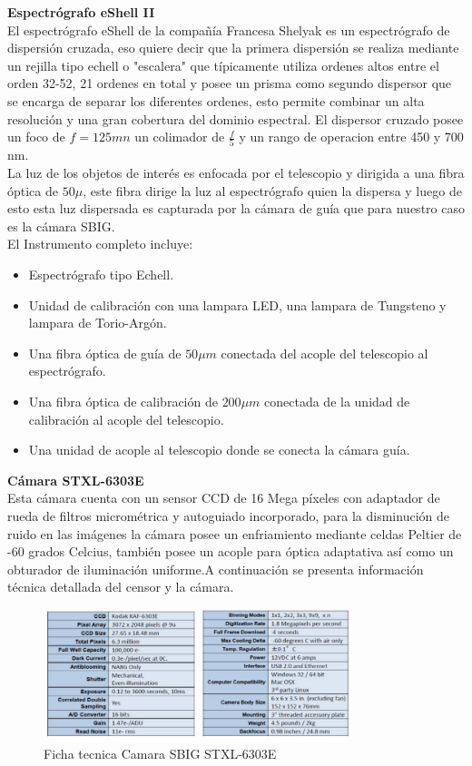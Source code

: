 \noindent \textbf{Espectrógrafo  eShell II }\\

\noindent El espectrógrafo eShell de la compañía Francesa Shelyak es un espectrógrafo de dispersión cruzada, eso quiere decir que la primera dispersión se realiza mediante un rejilla tipo echell  o "escalera" que típicamente utiliza ordenes altos entre el orden 32-52, 21 ordenes en total y posee un prisma como segundo dispersor que se encarga de separar los diferentes ordenes, esto permite combinar un alta resolución y una gran cobertura del dominio espectral.
El dispersor cruzado posee un foco de $f=125 mn$ un colimador de $\frac{f}{5}$ y un rango de operacion entre 450 y 700 nm.\\
La luz de los objetos de interés es enfocada por el telescopio y dirigida a una fibra óptica de $50\mu$, este fibra dirige la luz al espectrógrafo quien la dispersa y luego de esto esta luz dispersada es capturada por la cámara de guía que para nuestro caso es la cámara SBIG.\cite{echell}\\

\noindent El Instrumento completo incluye:

\begin{itemize}
    \item Espectrógrafo tipo Echell.
    \item Unidad de calibración con una lampara LED, una lampara de  Tungsteno y lampara de Torio-Argón.
    \item Una fibra óptica de guía de $50 \mu m$ conectada del acople del telescopio al espectrógrafo.
    \item Una fibra óptica de calibración de $200 \mu m$ conectada de la unidad de calibración al acople del telescopio.
    \item Una unidad de acople al telescopio donde se conecta la cámara guía.
\end{itemize}{}



\noindent \textbf{Cámara STXL-6303E }\\

\noindent Esta cámara cuenta con un sensor CCD de 16 Mega píxeles con adaptador de rueda de filtros micrométrica y autoguiado incorporado, para la disminución de ruido en las imágenes la cámara posee un enfriamiento mediante celdas Peltier de -60 grados Celcius, también posee un acople para óptica adaptativa así como un obturador de iluminación uniforme.A continuación se presenta información técnica detallada del censor y la cámara.

\begin{figure}[htb!]
\centering
\includegraphics[width=0.8\textwidth]{images/7.png}
\caption[Espectro continuo.]{Ficha tecnica Camara SBIG STXL-6303E\cite{gra7}}
 \label{fig2}
\end{figure}


